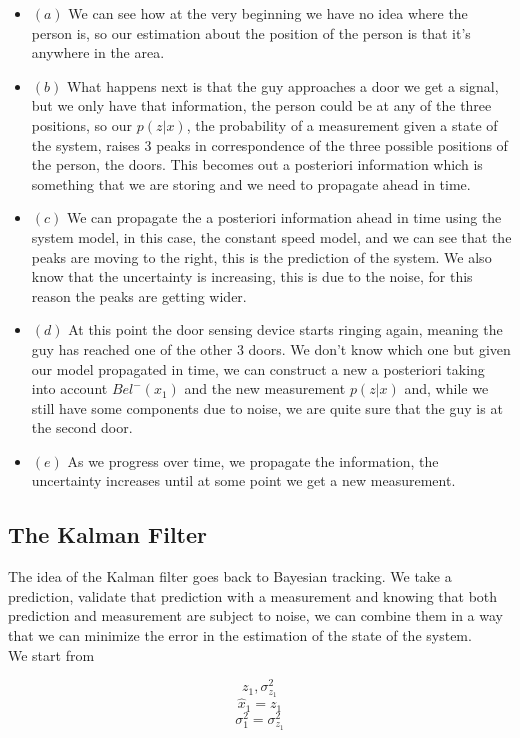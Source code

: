 \begin{itemize}

\item $(a)$ We can see how at the very beginning we have no idea where the person is, so our estimation about the position of the person is that it's anywhere in the area.
\item $(b)$ What happens next is that the guy approaches a door we get a signal, but we only have that information, the person could be at any of the three positions, so our $p(z|x)$, the probability of a measurement given a state of the system, raises 3 peaks in correspondence of the three possible positions of the person, the doors. This becomes out a posteriori information which is something that we are storing and we need to propagate ahead  in time.
\item $(c)$ We can propagate the a posteriori information ahead in time using the system model, in this case, the constant speed model, and we can see that the peaks are moving to the right, this is the prediction of the system. We also know that the uncertainty is increasing, this is due to the noise, for this reason the peaks are getting wider.
\item $(d)$ At this point the door sensing device starts ringing again, meaning the guy has reached one of the other 3 doors. We don't know which one but given our model propagated in time, we can construct a new a posteriori taking into account $Bel^{-}(x_1)$ and the new measurement $p(z|x)$ and, while we still have some components due to noise, we are quite sure that the guy is at the second door.
\item $(e)$ As we progress over time, we propagate the information, the uncertainty increases until at some point we get a new measurement.
\end{itemize}

\subsection{The Kalman Filter}

The idea of the Kalman filter goes back to Bayesian tracking. We take a prediction, validate that prediction with a measurement and knowing that both prediction and measurement are subject to noise, we can combine them in a way that we can minimize the error in the estimation of the state of the system.
\\

We start from

\[
    z_1, \sigma^2_{z_1}    
\]
\[
    \hat{x}_1 = z_1
\]
\[
    \sigma^2_1 = \sigma^2_{z_1}    
\]

